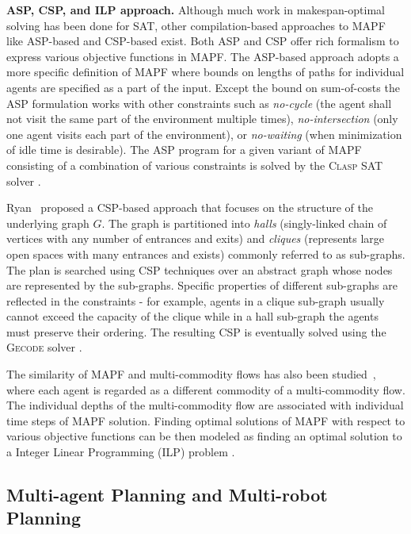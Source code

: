 \documentclass[jair,oneside,11pt]{article}
\begin{document}
{\bf ASP, CSP, and ILP approach.} Although much work in makespan-optimal solving has been done for SAT, other compilation-based approaches to MAPF like ASP-based \cite{erdem2013general} and CSP-based \cite{DBLP:conf/icra/Ryan10} exist. Both ASP and CSP offer rich formalism to express various objective functions in MAPF. The ASP-based approach adopts a more specific definition of MAPF where bounds on lengths of paths for individual agents are specified as a part of the input. Except the bound on sum-of-costs the ASP formulation works with other constraints such as {\em no-cycle} (the agent shall not visit the same part of the environment multiple times), {\em no-intersection} (only one agent visits each part of the environment), or {\em no-waiting} (when minimization of idle time is desirable). The ASP program for a given variant of MAPF consisting of a combination of various constraints is solved by the \textsc{Clasp} SAT solver \cite{DBLP:conf/lpnmr/GebserKNS07a}.

Ryan~\citeyear{DBLP:conf/icra/Ryan10} proposed a CSP-based approach that focuses on the structure of the underlying graph $G$. The graph is partitioned into {\em halls} (singly-linked chain of vertices with any number of entrances and exits) and {\em cliques} (represents large open spaces with many entrances and exists) commonly referred to as sub-graphs. The plan is searched using CSP techniques over an abstract graph whose nodes are represented by the sub-graphs. Specific properties of different sub-graphs are reflected in the constraints - for example, agents in a clique sub-graph usually cannot exceed the capacity of the clique while in a hall sub-graph the agents must preserve their ordering. The resulting CSP is eventually solved using the \textsc{Gecode} solver \cite{Tack:PhD:2009}.

The similarity of MAPF and multi-commodity flows has also been studied~\cite{DBLP:conf/aaai/YuL13}, where each agent is regarded as a different commodity of a multi-commodity flow. The individual depths of the multi-commodity flow are associated with individual time steps of MAPF solution. Finding optimal solutions of MAPF with respect to various objective functions can be then modeled as finding an optimal solution to a Integer Linear Programming (ILP) problem \cite{DBLP:conf/icra/YuL13}.


\subsection{Multi-agent Planning and Multi-robot Planning}
\end{document}
